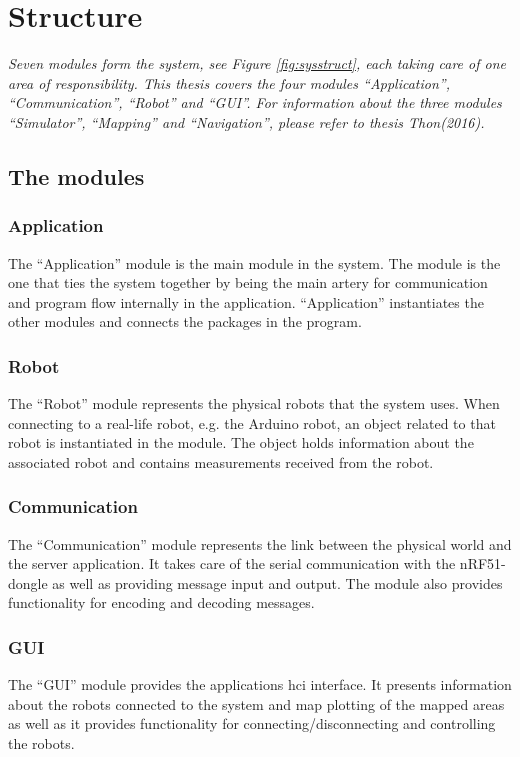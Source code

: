 \section{Structure}
\label{secr:structure}
\textit{Seven modules form the system, see Figure \ref{fig:sysstruct}, each taking care of one area of responsibility. This thesis covers the four modules ``Application'', ``Communication'', ``Robot'' and ``GUI''. For information about the three modules ``Simulator'', ``Mapping'' and ``Navigation'', please refer to thesis Thon(2016).}

\subsection{The modules}
\subsubsection{Application}
The ``Application'' module is the main module in the system. The module is the one that ties the system together by being the main artery for communication and program flow internally in the application. ``Application'' instantiates the other modules and connects the packages in the program.

\subsubsection{Robot}
The ``Robot'' module represents the physical robots that the system uses. When connecting to a real-life robot, e.g. the Arduino robot, an object related to that robot is instantiated in the module. The object holds information about the associated robot and contains measurements received from the robot.

\subsubsection{Communication}
The ``Communication'' module represents the link between the physical world and the server application. It takes care of the serial communication with the nRF51-dongle as well as providing message input and output. The module also provides functionality for encoding and decoding messages.

\subsubsection{GUI}
The ``GUI'' module provides the applications \acrshort{hci} interface. It presents information about the robots connected to the system and map plotting of the mapped areas as well as it provides functionality for connecting/disconnecting and controlling the robots.

